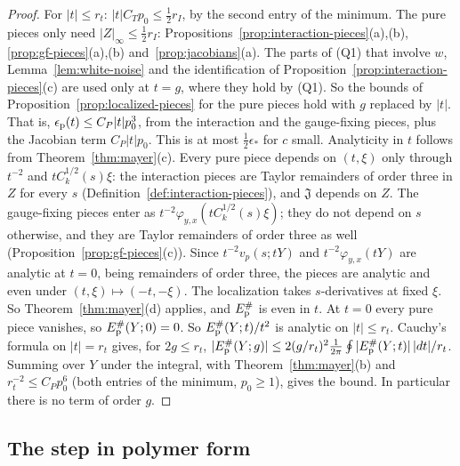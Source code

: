 \begin{proof}
For $|t|\le r_t$: $|t|C_Tp_0\le\frac12r_I$, by the second entry of the minimum. The pure pieces only need $|Z|_\infty\le\frac12r_I$: Propositions~\ref{prop:interaction-pieces}(a),(b), \ref{prop:gf-pieces}(a),(b) and~\ref{prop:jacobians}(a). The parts of (Q1) that involve $w$, Lemma~\ref{lem:white-noise} and the identification of Proposition~\ref{prop:interaction-pieces}(c) are used only at $t=g$, where they hold by (Q1). So the bounds of Proposition~\ref{prop:localized-pieces} for the pure pieces hold with $g$ replaced by $|t|$. That is, $\epsilon_{\rm p}(t)\le C_P|t|p_0^3$, from the interaction and the gauge-fixing pieces, plus the Jacobian term $C_P|t|p_0$. This is at most $\frac12\epsilon_*$ for $c$ small. Analyticity in $t$ follows from Theorem~\ref{thm:mayer}(c). Every pure piece depends on $(t,\xi)$ only through $t^{-2}$ and $tC_k^{1/2}(s)\xi$: the interaction pieces are Taylor remainders of order three in $Z$ for every $s$ (Definition~\ref{def:interaction-pieces}), and $\mathfrak J$ depends on $Z$. The gauge-fixing pieces enter as $t^{-2}\varphi_{y,x}(tC_k^{1/2}(s)\xi)$; they do not depend on $s$ otherwise, and they are Taylor remainders of order three as well (Proposition~\ref{prop:gf-pieces}(c)). Since $t^{-2}v_p(s;tY)$ and $t^{-2}\varphi_{y,x}(tY)$ are analytic at $t=0$, being remainders of order three, the pieces are analytic and even under $(t,\xi)\mapsto(-t,-\xi)$. The localization takes $s$-derivatives at fixed $\xi$. So Theorem~\ref{thm:mayer}(d) applies, and $E^\#_{\rm p}$ is even in $t$. At $t=0$ every pure piece vanishes, so $E^\#_{\rm p}(Y;0)=0$. So $E^\#_{\rm p}(Y;t)/t^2$ is analytic on $|t|\le r_t$. Cauchy's formula on $|t|=r_t$ gives, for $2g\le r_t$, $|E^\#_{\rm p}(Y;g)|\le2(g/r_t)^2\frac1{2\pi}\oint|E^\#_{\rm p}(Y;t)|\,|dt|/r_t$. Summing over $Y$ under the integral, with Theorem~\ref{thm:mayer}(b) and $r_t^{-2}\le C_Pp_0^6$ (both entries of the minimum, $p_0\ge1$), gives the bound. In particular there is no term of order $g$.
\end{proof}

\subsection{The step in polymer form}\label{subsec:cl-output}

